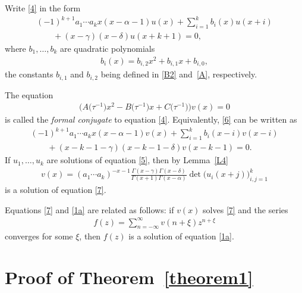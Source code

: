 \documentclass[11pt]{article}
\numberwithin{equation}{section}
\def\lc{,\allowbreak\ldots,\allowbreak}
\begin{document}
Write \eqref{4} in the form
\begin{gather}
(-1)^{k+1}a_1\cdots a_k x(x-\alpha-1) u(x) +\sum_{i=1}^k b_i(x) u(x+i) \nonumber\\
\qquad{} +(x-\gamma)(x-\delta) u(x+k+1) = 0, \label{5}
\end{gather}
where $b_1\lc b_k$ are quadratic polynomials
\begin{gather*}%
b_i(x)=b_{i,2}x^2+b_{i,1}x+b_{i,0},
\end{gather*}
the constants $b_{i,1}$ and $b_{i,2}$ being defined in \eqref{B2} and~\eqref{A}, respectively.

The equation
\begin{gather}
\big(A\big(\tau^{-1}\big) x^2-B\big(\tau^{-1}\big) x+C\big(\tau^{-1}\big)\big)v(x)=0\label{6}
\end{gather}
is called the {\it formal conjugate} to equation \eqref{4}. Equivalently, \eqref{6} can be written as
\begin{gather}
(-1)^{k+1}a_1\cdots a_k x(x-\alpha-1) v(x) +\sum_{i=1}^k b_i(x-i) v(x-i)\nonumber\\
\qquad{} + (x-k-1-\gamma)(x-k-1-\delta) v(x-k-1) = 0. \label{7}
\end{gather}
If $u_1\lc u_k$ are solutions of equation \eqref{5}, then by Lemma~\ref{L4}
\begin{gather}
v(x) = (a_1\cdots a_k)^{-x-1} \frac{\Gamma(x-\gamma) \Gamma(x-\delta)}{\Gamma(x+1) \Gamma(x-\alpha)}\det\bigl(u_i(x+j)\bigr)_{i,j=1}^k\label{8}
\end{gather}
is a solution of equation \eqref{7}.

Equations \eqref{7} and \eqref{1a} are related as follows: if $v(x)$ solves \eqref{7} and the series
\begin{gather}
f(z) = \sum_{n=-\infty}^\infty v(n+\xi) z^{n+\xi}\label{8a}
\end{gather}
converges for some $\xi $, then $f(z)$ is a solution of equation \eqref{1a}.

\section{Proof of Theorem~\ref{theorem1}}\label{section5}
\end{document}
